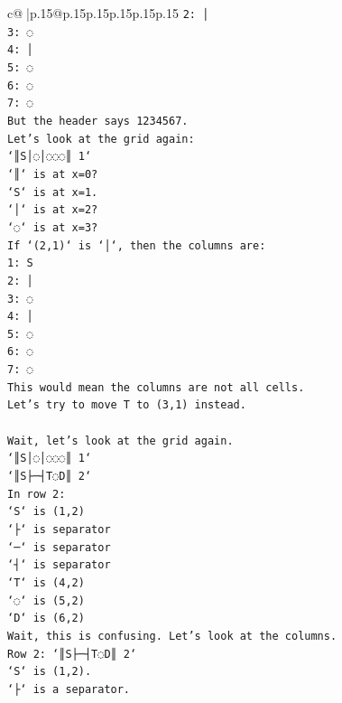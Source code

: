 \documentclass{article}
\begin{document}
{\begin{supertabular}{c@{$\;$}|p{.15\linewidth}@{}p{.15\linewidth}p{.15\linewidth}p{.15\linewidth}p{.15\linewidth}p{.15\linewidth}}
{{{\texttt{2: │} \\
\texttt{3: ◌} \\
\texttt{4: │} \\
\texttt{5: ◌} \\
\texttt{6: ◌} \\
\texttt{7: ◌} \\
\texttt{But the header says 1234567.} \\
\texttt{Let's look at the grid again:} \\
\texttt{`║S│◌│◌◌◌║ 1`} \\
\texttt{`║` is at x=0?} \\
\texttt{`S` is at x=1.} \\
\texttt{`│` is at x=2?} \\
\texttt{`◌` is at x=3?} \\
\texttt{If `(2,1)` is `│`, then the columns are:} \\
\texttt{1: S} \\
\texttt{2: │} \\
\texttt{3: ◌} \\
\texttt{4: │} \\
\texttt{5: ◌} \\
\texttt{6: ◌} \\
\texttt{7: ◌} \\
\texttt{This would mean the columns are not all cells.} \\
\texttt{Let's try to move T to (3,1) instead.} \\
\\ 
\texttt{Wait, let's look at the grid again.} \\
\texttt{`║S│◌│◌◌◌║ 1`} \\
\texttt{`║S├─┤T◌D║ 2`} \\
\texttt{In row 2:} \\
\texttt{`S` is (1,2)} \\
\texttt{`├` is separator} \\
\texttt{`─` is separator} \\
\texttt{`┤` is separator} \\
\texttt{`T` is (4,2)} \\
\texttt{`◌` is (5,2)} \\
\texttt{`D` is (6,2)} \\
\texttt{Wait, this is confusing. Let's look at the columns.} \\
\texttt{Row 2: `║S├─┤T◌D║ 2`} \\
\texttt{`S` is (1,2).} \\
\texttt{`├` is a separator.} \\
}}}
\end{supertabular}}
\end{document}
